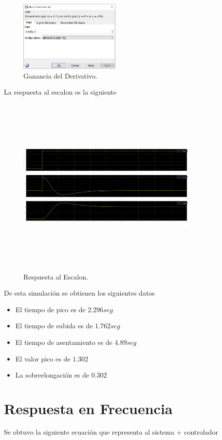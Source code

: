 \documentclass[a4paper]{IEEEtran} %
\begin{document}
\begin{figure}[h]
    \centering
        \includegraphics[width=5cm]{images/12}
        \caption{Ganancia del Derivativo.}
        \label{fig:config4}
\end{figure}
\vspace{20mm}
La respuesta al escalon es la siguiente
\begin{figure}[h]
    \centering
        \includegraphics[width=9cm, height=9cm]{images/13}
        \caption{Respuesta al Escalon.}
        \label{fig:result}
\end{figure}

De esta simulación se obtienen los siguientes datos
\begin{itemize}
    \item El tiempo de pico es de $2.296seg$
    \item El tiempo de subida es de $1.762seg$
    \item El tiempo de asentamiento es de $4.89seg$
    \item El valor pico es de $1.302$
    \item La sobreelongación es de $0.302$
\end{itemize}   
\section{Respuesta en Frecuencia}
Se obtuvo la siguiente ecuación que representa al sistema + controlador
\end{document}

